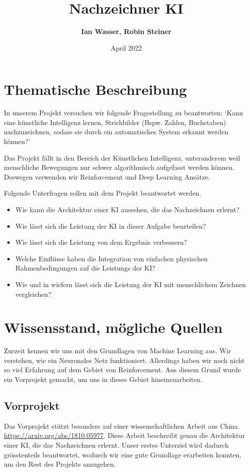 \documentclass{article}
\title{\textbf{Nachzeichner KI}}
\author{\textbf{Ian Wasser, Robin Steiner}}
\date{April 2022}
\begin{document}
\maketitle

\tableofcontents

\pagebreak

\section{Thematische Beschreibung}
\label{chap:thematische-beschreibung}
In unserem Projekt versuchen wir folgende Fragestellung zu beantworten: `Kann
eine künstliche Intelligenz lernen, Strichbilder (Bspw. Zahlen, Buchstaben)
nachzuzeichnen, sodass sie durch ein automatisches System erkannt werden
können?'

Das Projekt fällt in den Bereich der Künstlichen Intelligenz, unteranderem weil
menschliche Bewegungen nur schwer algorithmisch aufgefasst werden können.
Deswegen verwenden wir Reinforcement und Deep Learning Ansätze.

Folgende Unterfragen sollen mit dem Projekt beantwortet werden.

\begin{itemize}
    \item Wie kann die Architektur einer KI aussehen, die das Nachzeichnen erlernt?
    \item Wie lässt sich die Leistung der KI in dieser Aufgabe beurteilen?
    \item Wie lässt sich die Leistung von dem Ergebnis verbessern?
    \item Welche Einflüsse haben die Integration von einfachen physischen Rahmenbedingungen auf die Leistungs der KI?
    \item Wie und in wiefern lässt sich die Leistung der KI mit menschlichem Zeichnen vergleichen?
\end{itemize}

\section{Wissensstand, mögliche Quellen}
\label{chap:wissensstand}

Zurzeit kennen wir uns mit den Grundlagen von Machine Learning aus. Wir
verstehen, wie ein Neuronales Netz funktioniert. Allerdings haben wir noch nicht
so viel Erfahrung auf dem Gebiet von Reinforcement. Aus diesem Grund wurde ein
Vorprojekt gemacht, um uns in dieses Gebiet hineinzuarbeiten.

\subsection{Vorprojekt}
Das Vorprojekt stützt besonders auf einer wissenschaftlichen Arbeit aus China.
\url{https://arxiv.org/abs/1810.05977}. Diese Arbeit beschreibt genau die
Architektur einer KI, die das Nachzeichnen erlernt. Unser erstes Unterziel wird
dadurch grösstenteils beantwortet, wodurch wir eine gute Grundlage erarbeiten
konnten, um den Rest des Projekts anzugehen.
\end{document}
